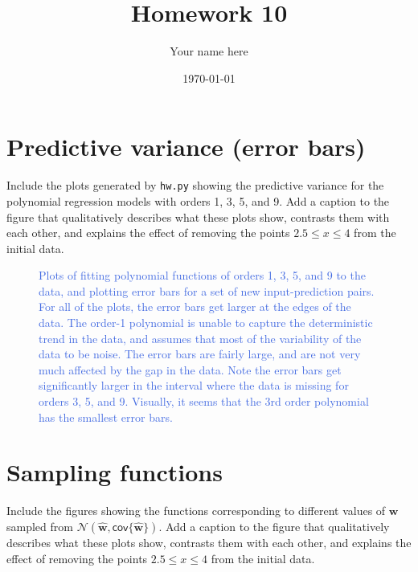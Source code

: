 \documentclass[11pt]{article}
\title{Homework 10}
\author{Your name here}
\date{\today{}}
\begin{document}
\maketitle

\section{Predictive variance (error bars)}

Include the plots generated by \texttt{hw.py} showing the predictive variance
for the polynomial regression models with orders 1, 3, 5, and 9.  Add a caption to
the figure that qualitatively describes what these plots show, contrasts them
with each other, and explains the effect of removing the points $2.5\leq x \leq
4$ from the initial data.

\begin{figure}[htbp]
    \centering
    \caption{\textcolor{RoyalBlue}{Plots of fitting polynomial functions of orders 1, 3, 5, and 9 to
        the data, and plotting error bars for a set of new input-prediction
        pairs.
        For all of the plots, the error bars get larger at the edges of the
        data.
        The order-1 polynomial is unable to capture the deterministic trend in
        the data, and assumes that most of the variability of the data to be
        noise. The error bars are fairly large, and are not very much affected
        by the gap in the data.
        Note the error bars get significantly
        larger in the interval where the data is missing for orders 3, 5, and 9.
        Visually, it seems that the 3rd order polynomial has the smallest error
        bars.}}
    \label{fig:error_bars}
\end{figure}

\newpage

\section{Sampling functions}

Include the figures showing the functions corresponding to different values of
$\mathbf{w}$ sampled from $\mathcal{N}(\widehat{\mathbf{w}}, \textsf{cov}\{\widehat{\mathbf{w}}\})$.
Add a caption to the figure that qualitatively describes what these
plots show, contrasts them with each other, and explains the effect of removing
the points $2.5\leq x \leq 4$ from the initial data.
\end{document}
